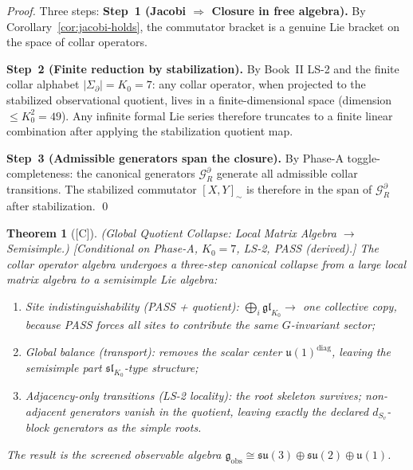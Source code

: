 \documentclass[12pt,oneside]{amsbook}
\theoremstyle{plain}
\newtheorem{theorem}{Theorem}[section]
\theoremstyle{definition}
\theoremstyle{remark}
\newcommand{\status}[1]{\textup{[#1]}}
\begin{document}
\begin{proof}
Three steps:
\textbf{Step~1 (Jacobi $\Rightarrow$ Closure in free algebra).}
By Corollary~\ref{cor:jacobi-holds}, the commutator bracket
is a genuine Lie bracket on the space of collar operators.

\textbf{Step~2 (Finite reduction by stabilization).}
By Book~II LS-2 and the finite collar alphabet $|\Sigma_\partial|
= K_0 = 7$: any collar operator, when projected to the
stabilized observational quotient, lives in a finite-dimensional
space (dimension $\leq K_0^2 = 49$). Any infinite formal Lie
series therefore truncates to a finite linear combination after
applying the stabilization quotient map.

\textbf{Step~3 (Admissible generators span the closure).}
By Phase-A toggle-completeness: the canonical generators
$\mathcal{G}_R^\partial$ generate all admissible collar
transitions. The stabilized commutator $[X, Y]_{\sim}$ is
therefore in the span of $\mathcal{G}_R^\partial$ after
stabilization. \qed
\end{proof}

\begin{theorem}[\status{C}]\label{thm:quotient-collapse}
\textup{(Global Quotient Collapse: Local Matrix Algebra $\to$
Semisimple.)}
\textup{[Conditional on Phase-A, $K_0=7$, LS-2, PASS (derived).]}
The collar operator algebra undergoes a three-step canonical
collapse from a large local matrix algebra to a semisimple Lie
algebra:
\begin{enumerate}[label=\textup{(\arabic*)}]
 \item \emph{Site indistinguishability (PASS + quotient)}:
 $\bigoplus_i \mathfrak{gl}_{K_0} \to$ one collective copy,
 because PASS forces all sites to contribute the same
 $G$-invariant sector;
 \item \emph{Global balance (transport)}: removes the scalar
 center $\mathfrak{u}(1)^{\mathrm{diag}}$, leaving the
 semisimple part $\mathfrak{sl}_{K_0}$-type structure;
 \item \emph{Adjacency-only transitions (LS-2 locality)}:
 the root skeleton survives; non-adjacent generators vanish
 in the quotient, leaving exactly the declared $d_{S_v}$-block
 generators as the simple roots.
\end{enumerate}
The result is the screened observable algebra
$\mathfrak{g}_{\mathrm{obs}} \cong
\mathfrak{su}(3)\oplus\mathfrak{su}(2)\oplus\mathfrak{u}(1)$.
\end{theorem}
\end{document}
